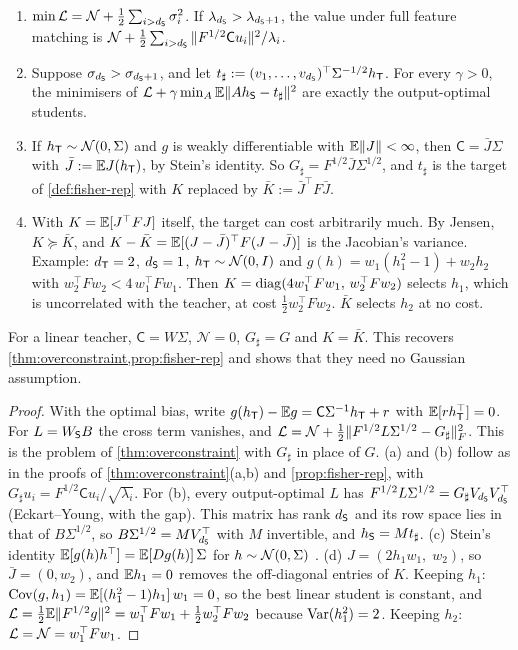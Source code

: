 \begin{theorem}\label{thm:stein}
\Mo\Ck
\begin{enumerate}[label=(\alph*),nosep]
\item $\min\mathcal{L}=\mathcal N+\frac12\sum_{i>d_{\mathsf{S}}}\sigma_i^2$. If $\lambda_{d_{\mathsf{S}}}>\lambda_{d_{\mathsf{S}}+1}$, the value under full feature matching is
$\mathcal N+\frac12\sum_{i>d_{\mathsf{S}}}\|F^{1/2}\mathsf Cu_i\|^2/\lambda_i$.
\item Suppose $\sigma_{d_{\mathsf{S}}}>\sigma_{d_{\mathsf{S}}+1}$, and let $t_\sharp:=(v_1,\dots,v_{d_{\mathsf{S}}})^\top\Sigma^{-1/2}h_{\mathsf{T}}$. For every $\gamma>0$, the
minimisers of $\mathcal{L}+\gamma\min_A\mathbb{E}\|Ah_{\mathsf{S}}-t_\sharp\|^2$ are exactly the output-optimal students.
\item If $h_{\mathsf{T}}\sim\mathcal{N}(0,\Sigma)$ and $g$ is weakly differentiable with $\mathbb{E}\|J\|<\infty$, then $\mathsf C=\bar J\Sigma$ with $\bar J:=\mathbb{E} J(h_{\mathsf{T}})$,
by Stein's identity. So $G_\sharp=F^{1/2}\bar J\Sigma^{1/2}$, and $t_\sharp$ is the target of \cref{def:fisher-rep} with $K$ replaced by
$\bar K:=\bar J^\top F\bar J$.
\item With $K=\mathbb{E}[J^\top FJ]$ itself, the target can cost arbitrarily much. By Jensen, $K\succeq\bar K$, and
$K-\bar K=\mathbb{E}[(J-\bar J)^\top F(J-\bar J)]$ is the Jacobian's variance. Example: $d_{\mathsf{T}}=2$, $d_{\mathsf{S}}=1$, $h_{\mathsf{T}}\sim\mathcal{N}(0,I)$ and
$g(h)=w_1(h_1^2-1)+w_2h_2$ with $w_2^\top Fw_2<4\,w_1^\top Fw_1$. Then $K=\operatorname{diag}(4w_1^\top Fw_1,\,w_2^\top Fw_2)$ selects $h_1$, which is
uncorrelated with the teacher, at cost $\frac12w_2^\top Fw_2$. $\bar K$ selects $h_2$ at no cost.
\end{enumerate}
For a linear teacher, $\mathsf C=W\Sigma$, $\mathcal N=0$, $G_\sharp=G$ and $K=\bar K$. This recovers \cref{thm:overconstraint,prop:fisher-rep}
and shows that they need no Gaussian assumption.
\end{theorem}
\begin{proof}
With the optimal bias, write $g(h_{\mathsf{T}})-\mathbb{E} g=\mathsf C\Sigma^{-1}h_{\mathsf{T}}+r$ with $\mathbb{E}[rh_{\mathsf{T}}^\top]=0$. For $L=W_{\mathsf{S}} B$ the cross term vanishes, and
$\mathcal{L}=\mathcal N+\frac12\|F^{1/2}L\Sigma^{1/2}-G_\sharp\|_F^2$. This is the problem of \cref{thm:overconstraint} with $G_\sharp$ in place of $G$.
(a) and (b) follow as in the proofs of \cref{thm:overconstraint}(a,b) and \cref{prop:fisher-rep}, with
$G_\sharp u_i=F^{1/2}\mathsf Cu_i/\sqrt{\lambda_i}$. For (b), every output-optimal $L$ has $F^{1/2}L\Sigma^{1/2}=G_\sharp V_{d_{\mathsf{S}}}V_{d_{\mathsf{S}}}^\top$
(Eckart--Young, with the gap). This matrix has rank $d_{\mathsf{S}}$ and its row space lies in that of $B\Sigma^{1/2}$, so
$B\Sigma^{1/2}=MV_{d_{\mathsf{S}}}^\top$ with $M$ invertible, and $h_{\mathsf{S}}=Mt_\sharp$.
(c) Stein's identity $\mathbb{E}[g(h)h^\top]=\mathbb{E}[Dg(h)]\,\Sigma$ for $h\sim\mathcal{N}(0,\Sigma)$ \citep{stein1981estimation}.
(d) $J=(2h_1w_1,\;w_2)$, so $\bar J=(0,w_2)$, and $\mathbb{E} h_1=0$ removes the off-diagonal entries of $K$. Keeping $h_1$:
$\operatorname{Cov}(g,h_1)=\mathbb{E}[(h_1^2-1)h_1]\,w_1=0$, so the best linear student is constant, and
$\mathcal{L}=\frac12\mathbb{E}\|F^{1/2}g\|^2=w_1^\top Fw_1+\frac12w_2^\top Fw_2$ because $\operatorname{Var}(h_1^2)=2$. Keeping $h_2$: $\mathcal{L}=\mathcal N=w_1^\top Fw_1$.
\end{proof}

